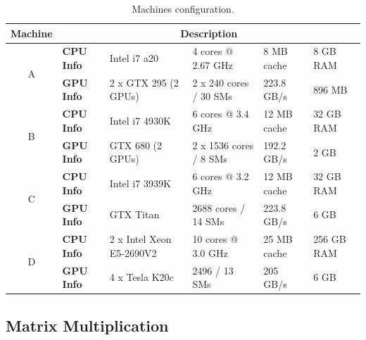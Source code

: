 \documentclass[journal]{IEEEtran}
\begin{document}
\begin{table}[t]
\begin{scriptsize}
\caption{Machines configuration.\label{table:machines}}
\begin{center}

\begin{tabular}{|c|l|l|l|l|l|} \hline
\multicolumn{1}{|l|}{Machine} & \multicolumn{5}{|c|}{\textbf{Description}}                                                           \\ \hline
\multirow{2}{*}{A}          & \textbf{CPU Info} & Intel i7 a20   & 4 cores  @ 2.67 GHz  &   8 MB cache   & 8 GB RAM     \\ \cline{2-6}
                            & \textbf{GPU Info} & 2 x GTX 295 (2 GPUs)    & 2 x 240 cores / 30 SMs      & 223.8 GB/s  & 896 MB      \\ \hline
\multirow{2}{*}{B}          & \textbf{CPU Info} & Intel i7 4930K & 6 cores    @ 3.4 GHz & 12 MB cache       & 32 GB RAM   \\  \cline{2-6}
                            & \textbf{GPU Info} & GTX 680 (2 GPUs)        & 2 x 1536 cores / 8 SMs & 192.2 GB/s  & 2 GB      \\ \hline
\multirow{2}{*}{C}          & \textbf{CPU Info} & Intel i7 3939K & 6 cores    @ 3.2 GHz & 12 MB cache & 32 GB RAM      \\  \cline{2-6}
                            & \textbf{GPU Info} & GTX Titan      & 2688 cores / 14 SMs & 223.8 GB/s  & 6 GB        \\ \hline
\multirow{2}{*}{D}          & \textbf{CPU Info} & 2 x Intel Xeon E5-2690V2 & 10 cores   @ 3.0 GHz &            25 MB cache           & 256 GB RAM            \\  \cline{2-6}
                            & \textbf{GPU Info} & 4 x Tesla K20c & 2496 / 13 SMs       & 205 GB/s     & 6 GB                              \\ \hline 
\end{tabular}
\end{center}

\end{scriptsize}
\end{table}


\subsection{Matrix Multiplication}
\end{document}
